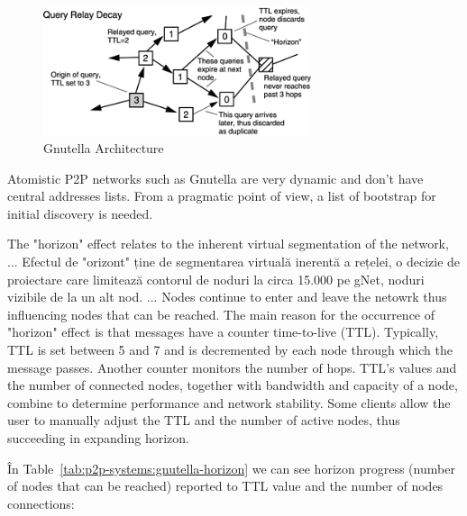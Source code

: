 \begin{figure}
  \centering
  \includegraphics[width=0.7\textwidth]{src/img/p2p-systems/gnutella}
  \caption{Gnutella Architecture}
  \label{fig:p2p-systems:gnutella}
\end{figure}

Atomistic P2P networks such as Gnutella are very dynamic and don't have central
addresses lists. From a pragmatic point of view, a list of bootstrap for initial
discovery is needed.

The "horizon" effect relates to the inherent virtual segmentation of the
network, ... Efectul de "orizont" ține de segmentarea virtuală inerentă
a rețelei, o decizie de proiectare care limitează contorul de noduri la
circa 15.000 pe gNet, noduri vizibile de la un alt nod. ... Nodes continue to
enter and leave the netowrk thus influencing nodes that can be reached. The
main reason for the occurrence of "horizon" effect is that messages have a
counter time-to-live (TTL). Typically, TTL is set between 5 and 7 and is
decremented by each node through which the message passes. Another counter
monitors the number of hops. TTL's values and the number of connected nodes,
together with bandwidth and capacity of a node, combine to determine performance
and network stability. Some clients allow the user to manually adjust the TTL
and the number of active nodes, thus succeeding in expanding horizon.

În Table~\ref{tab:p2p-systems:gnutella-horizon} we can see horizon progress
(number of nodes that can be reached) reported to TTL value and the number of
nodes connections:

